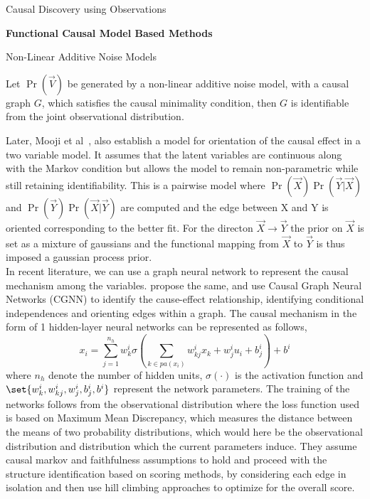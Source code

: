 \documentclass[10pt]{article}
\begin{document}
\begin{psection}[3]{Causal Discovery using Observations}
\begin{psubsection}{\textbf{Functional Causal Model Based Methods}}
\begin{pssubsection}{Non-Linear Additive Noise Models}
            \begin{theorem} Let $\Pr(\vec{V})$ be generated by a non-linear additive
                noise model, with a causal graph $G$, which satisfies the causal
                minimality condition, then $G$ is identifiable from the joint
                observational distribution.  
            \end{theorem}
            Later, Mooji et al~\cite{stegle2010probabilistic}, also establish a model
            for orientation of the causal effect in a two variable model. It assumes
            that the latent variables are continuous along with the Markov condition but
            allows the model to remain non-parametric while still retaining
            identifiability. This is a pairwise model where
            $\Pr(\vec{X})\Pr(\vec{Y}\vert \vec{X})$ and $\Pr(\vec{Y})\Pr(\vec{X}\vert
            \vec{Y})$ are computed and the edge between X and Y is oriented
            corresponding to the better fit. For the directon $\vec{X} \rightarrow
            \vec{Y}$ the prior on $\vec{X}$ is set as a mixture of gaussians and the
            functional mapping from $\vec{X}$ to $\vec{Y}$ is thus imposed a gaussian
            process prior. \\
        In recent literature, we can use a graph neural network to represent the causal
        mechanism among the variables. \citet{goudet2018learning} propose the same, and
        use Causal Graph Neural Networks (CGNN) to identify the cause-effect
        relationship, identifying conditional independences and orienting edges within
        a graph. The causal mechanism in the form of 1 hidden-layer neural networks can
        be represented as follows,
        \begin{equation}
            x_i = \sum_{j=1}^{n_h} w^i_k \sigma\left(\sum_{k \in pa(x_i)} w^i_{kj} x_k +
            w^i_j u_i + b^i_j\right) + b^i
        \end{equation}
        where $n_h$ denote the number of hidden units, $\sigma(\cdot)$ is the activation
        function and \\ $\set{w^i_k, w^i_{kj}, w^i_j, b^i_j, b^i}$ represent the network
        parameters. The training of the networks follows from the observational
        distribution where the loss function used is based on Maximum Mean Discrepancy,
        which measures the distance between the means of two probability distributions,
        which would here be the observational distribution and distribution which the
        current parameters induce. They assume causal markov and faithfulness
        assumptions to hold and proceed with the structure identification based on
        scoring methods, by considering each edge in isolation and then use hill
        climbing approaches to optimize for the overall score. 
        \end{pssubsection}
    

\end{psubsection}
\end{psection}
\end{document}
